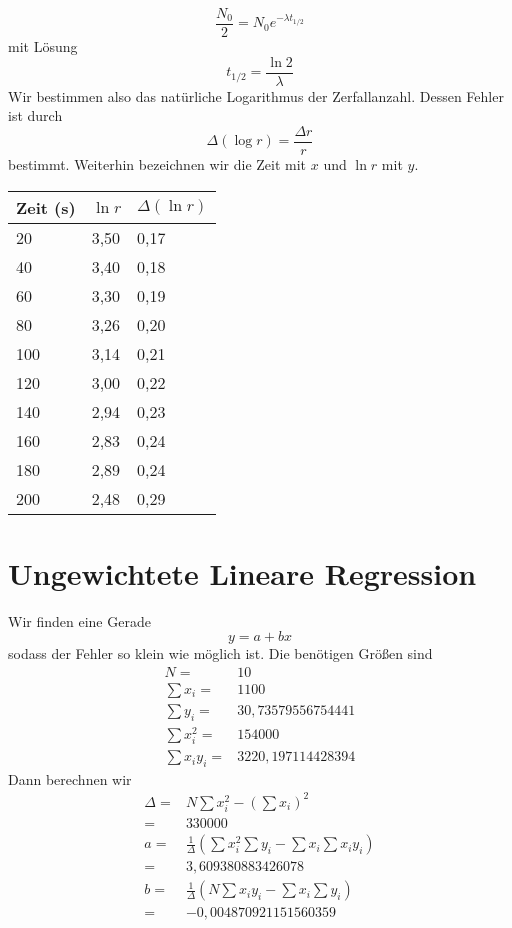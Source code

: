 \documentclass[prb,12pt]{revtex4-2}
\theoremstyle{definition}
\theoremstyle{definition}
\begin{document}
\[
	\frac{N_0}{2} = N_0e^{-\lambda t_{1/2}}
\]
mit Lösung
\begin{equation}
	t_{1/2}=\frac{\ln 2}{\lambda}
\end{equation}
Wir bestimmen also das natürliche Logarithmus der Zerfallanzahl. Dessen Fehler ist durch
\[\Delta(\log r)= \frac{\Delta r}{r}\]
bestimmt. Weiterhin bezeichnen wir die Zeit mit $x$ und $\ln r$ mit $y$.
\begin{center}
	\begin{tabular}{p{2cm}p{2cm}p{2cm}}
		\toprule
\textbf{Zeit (s)} & $\ln r$ & $\Delta(\ln r)$\\\midrule
 20 & 3,50 & 0,17 \\\midrule
40 & 3,40 & 0,18 \\\midrule
60 & 3,30 & 0,19 \\\midrule
80 & 3,26 & 0,20 \\\midrule
100 & 3,14 & 0,21 \\\midrule
120 & 3,00 & 0,22 \\\midrule
140 & 2,94 & 0,23 \\\midrule
160 & 2,83 & 0,24 \\\midrule
180 & 2,89 & 0,24 \\\midrule
200 & 2,48 & 0,29 \\\bottomrule
	\end{tabular}
\end{center}
\section{Ungewichtete Lineare Regression}
Wir finden eine Gerade
\[y=a+bx\]
sodass der Fehler so klein wie möglich ist. Die benötigen Größen sind
\begin{align*}
	N=&10\\
	\sum x_i=&1100\\
	\sum y_i=&30,73579556754441\\
	\sum x_i^2=&154000\\
	\sum x_i y_i=&3220,197114428394
\end{align*}
Dann berechnen wir
\begin{align*}
	\Delta =& N\sum x_i^2- (\sum x_i)^2\\
	=&330000\\
	a=&\frac 1\Delta(\sum x_i^2 \sum y_i-\sum x_i \sum x_i y_i)\\
	=& 3,609380883426078\\
	b=&\frac 1\Delta (N \sum x_i y_i - \sum x_i \sum y_i)\\
	=&-0,004870921151560359
\end{align*}
\end{document}
